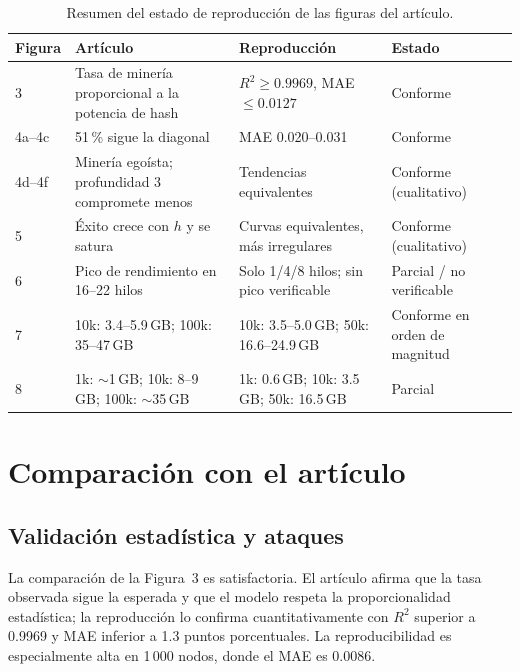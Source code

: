 \documentclass[11pt,a4paper,oneside]{article}
\begin{document}
\begin{table}[H]
\caption{Resumen del estado de reproducción de las figuras del artículo.}
\label{tab:resumen}
\centering
\small
\renewcommand{\arraystretch}{1.15}
\begin{tabularx}{\textwidth}{lXXl}
\toprule
\rowcolor{tablehead}
\textbf{Figura} & \textbf{Artículo} & \textbf{Reproducción} & \textbf{Estado} \\
\midrule
3 & Tasa de minería proporcional a la potencia de hash & $R^2 \ge 0.9969$, MAE $\le 0.0127$ & Conforme \\
4a--4c & 51\,\% sigue la diagonal & MAE 0.020--0.031 & Conforme \\
4d--4f & Minería egoísta; profundidad 3 compromete menos & Tendencias equivalentes & Conforme (cualitativo) \\
5 & Éxito crece con $h$ y se satura & Curvas equivalentes, más irregulares & Conforme (cualitativo) \\
6 & Pico de rendimiento en 16--22 hilos & Solo 1/4/8 hilos; sin pico verificable & Parcial / no verificable \\
7 & 10k: 3.4--5.9\,GB; 100k: 35--47\,GB & 10k: 3.5--5.0\,GB; 50k: 16.6--24.9\,GB & Conforme en orden de magnitud \\
8 & 1k: $\sim$1\,GB; 10k: 8--9\,GB; 100k: $\sim$35\,GB & 1k: 0.6\,GB; 10k: 3.5\,GB; 50k: 16.5\,GB & Parcial \\
\bottomrule
\end{tabularx}
\end{table}

\section{Comparación con el artículo}
\label{sec:comparacion}

\subsection{Validación estadística y ataques}

La comparación de la Figura~3 es satisfactoria. El artículo afirma que la tasa observada sigue la esperada y que el modelo respeta la proporcionalidad estadística; la reproducción lo confirma cuantitativamente con $R^2$ superior a 0.9969 y MAE inferior a 1.3 puntos porcentuales. La reproducibilidad es especialmente alta en 1\,000 nodos, donde el MAE es 0.0086.
\end{document}
